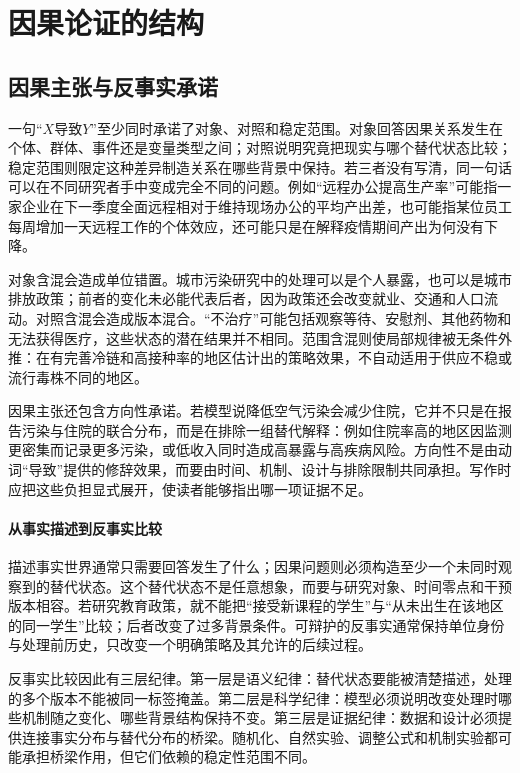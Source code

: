 \section{因果论证的结构}

\subsection{因果主张与反事实承诺}

一句“$X$导致$Y$”至少同时承诺了对象、对照和稳定范围。对象回答因果关系发生在个体、群体、事件还是变量类型之间；对照说明究竟把现实与哪个替代状态比较；稳定范围则限定这种差异制造关系在哪些背景中保持。若三者没有写清，同一句话可以在不同研究者手中变成完全不同的问题。例如“远程办公提高生产率”可能指一家企业在下一季度全面远程相对于维持现场办公的平均产出差，也可能指某位员工每周增加一天远程工作的个体效应，还可能只是在解释疫情期间产出为何没有下降。

对象含混会造成单位错置。城市污染研究中的处理可以是个人暴露，也可以是城市排放政策；前者的变化未必能代表后者，因为政策还会改变就业、交通和人口流动。对照含混会造成版本混合。“不治疗”可能包括观察等待、安慰剂、其他药物和无法获得医疗，这些状态的潜在结果并不相同。范围含混则使局部规律被无条件外推：在有完善冷链和高接种率的地区估计出的策略效果，不自动适用于供应不稳或流行毒株不同的地区。

因果主张还包含方向性承诺。若模型说降低空气污染会减少住院，它并不只是在报告污染与住院的联合分布，而是在排除一组替代解释：例如住院率高的地区因监测更密集而记录更多污染，或低收入同时造成高暴露与高疾病风险。方向性不是由动词“导致”提供的修辞效果，而要由时间、机制、设计与排除限制共同承担。写作时应把这些负担显式展开，使读者能够指出哪一项证据不足。

\paragraph{从事实描述到反事实比较}

描述事实世界通常只需要回答发生了什么；因果问题则必须构造至少一个未同时观察到的替代状态。这个替代状态不是任意想象，而要与研究对象、时间零点和干预版本相容。若研究教育政策，就不能把“接受新课程的学生”与“从未出生在该地区的同一学生”比较；后者改变了过多背景条件。可辩护的反事实通常保持单位身份与处理前历史，只改变一个明确策略及其允许的后续过程。

反事实比较因此有三层纪律。第一层是语义纪律：替代状态要能被清楚描述，处理的多个版本不能被同一标签掩盖。第二层是科学纪律：模型必须说明改变处理时哪些机制随之变化、哪些背景结构保持不变。第三层是证据纪律：数据和设计必须提供连接事实分布与替代分布的桥梁。随机化、自然实验、调整公式和机制实验都可能承担桥梁作用，但它们依赖的稳定性范围不同。

